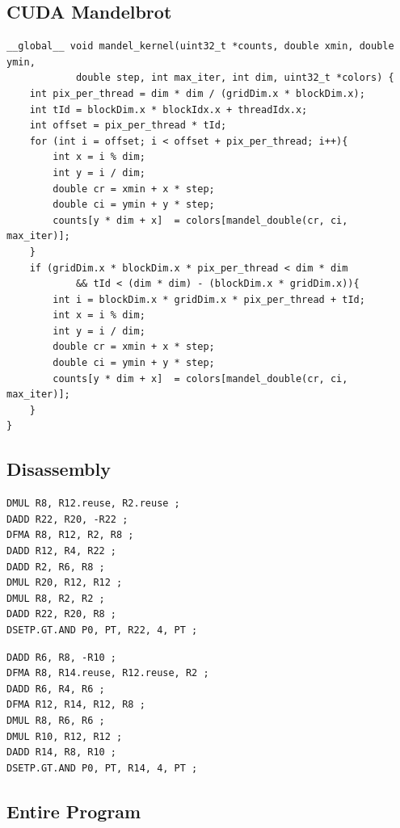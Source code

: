 \documentclass{article}
\begin{document}
        \subsection{CUDA Mandelbrot}\label{appendix:cuda}
\begin{lstlisting}
__global__ void mandel_kernel(uint32_t *counts, double xmin, double ymin,
            double step, int max_iter, int dim, uint32_t *colors) {
    int pix_per_thread = dim * dim / (gridDim.x * blockDim.x);
    int tId = blockDim.x * blockIdx.x + threadIdx.x;
    int offset = pix_per_thread * tId;
    for (int i = offset; i < offset + pix_per_thread; i++){
        int x = i % dim;
        int y = i / dim;
        double cr = xmin + x * step;
        double ci = ymin + y * step;
        counts[y * dim + x]  = colors[mandel_double(cr, ci, max_iter)];
    }
    if (gridDim.x * blockDim.x * pix_per_thread < dim * dim
            && tId < (dim * dim) - (blockDim.x * gridDim.x)){
        int i = blockDim.x * gridDim.x * pix_per_thread + tId;
        int x = i % dim;
        int y = i / dim;
        double cr = xmin + x * step;
        double ci = ymin + y * step;
        counts[y * dim + x]  = colors[mandel_double(cr, ci, max_iter)];
    }
}
\end{lstlisting}
        \subsection{Disassembly}\label{appendix:assembly}
\begin{lstlisting}[caption={before instruction optimization}]
DMUL R8, R12.reuse, R2.reuse ;
DADD R22, R20, -R22 ;
DFMA R8, R12, R2, R8 ;
DADD R12, R4, R22 ;
DADD R2, R6, R8 ;
DMUL R20, R12, R12 ;
DMUL R8, R2, R2 ;
DADD R22, R20, R8 ;
DSETP.GT.AND P0, PT, R22, 4, PT ;
\end{lstlisting}

\begin{lstlisting}[caption={after instruction optimization}]
DADD R6, R8, -R10 ;
DFMA R8, R14.reuse, R12.reuse, R2 ;
DADD R6, R4, R6 ;
DFMA R12, R14, R12, R8 ;
DMUL R8, R6, R6 ;
DMUL R10, R12, R12 ;
DADD R14, R8, R10 ;
DSETP.GT.AND P0, PT, R14, 4, PT ;
\end{lstlisting}
    \lstset{language=C}
        \subsection{Entire Program} \label{appendix:mandelbrot.cu}
            
\end{document}
